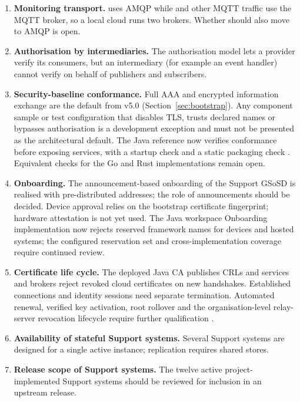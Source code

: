 \documentclass[a4paper]{arrowhead}
\newcommand{\svc}[1]{\textcolor{ArrowheadPurple}{\textit{\ahbreak{#1}}}}    %
\begin{document}
\begin{enumerate}
  \item \textbf{Monitoring transport.} \svc{sysMonitor} uses AMQP while \svc{sysMonitorData} and
        other MQTT traffic use the MQTT broker, so a local cloud runs two brokers. Whether
        \svc{sysMonitorData} should also move to AMQP is open.
  \item \textbf{Authorisation by intermediaries.} The authorisation model lets a provider verify
        its consumers, but an intermediary (for example an event handler) cannot verify on behalf
        of publishers and subscribers.
  \item \textbf{Security-baseline conformance.} Full AAA and encrypted information exchange
        are the default from v5.0 (Section~\ref{sec:bootstrap}). Any component sample or test
        configuration that disables TLS, trusts declared names or bypasses authorisation
        is a development exception and must not be presented as the architectural default.
        The Java reference now verifies conformance before exposing services, with a startup
        check and a static packaging check \cite{javaConformance20261107}. Equivalent checks
        for the Go and Rust implementations remain open.
  \item \textbf{Onboarding.} The announcement-based onboarding of the Support GSoSD
        \cite{gsosdsup50} is realised with pre-distributed addresses; the role of announcements
        should be decided. Device approval relies on the bootstrap certificate fingerprint;
        hardware attestation is not yet used. The Java workspace Onboarding implementation
        now rejects reserved framework names for devices and hosted systems; the configured
        reservation set and cross-implementation coverage require continued review.
  \item \textbf{Certificate life cycle.} The deployed Java CA publishes CRLs and services
        and brokers reject revoked cloud certificates on new handshakes. Established
        connections and identity sessions need separate termination. Automated renewal,
        verified key activation, root rollover and the organisation-level relay-server
        revocation lifecycle require further qualification
        \cite{javaDeployment20261024,rustFederation20261019}.
  \item \textbf{Availability of stateful Support systems.} Several Support systems are designed for a
        single active instance; replication requires shared stores.
  \item \textbf{Release scope of Support systems.} The twelve active project-implemented Support systems
        should be reviewed for inclusion in an upstream release.
\end{enumerate}
\end{document}
